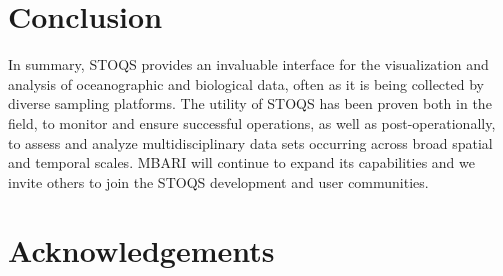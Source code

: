 \documentclass[conference]{IEEEtran}
\begin{document}
%





\section{Conclusion}
In summary, STOQS provides an invaluable interface for the visualization and analysis of oceanographic and biological data, often as it is being collected by diverse sampling platforms.  The utility of STOQS has been proven both in the field, to monitor and ensure successful operations, as well as post-operationally, to assess and analyze multidisciplinary data sets occurring across broad spatial and temporal scales. MBARI will continue to expand its capabilities and we invite others to join the STOQS development and user communities.






\section*{Acknowledgements}
\end{document}
